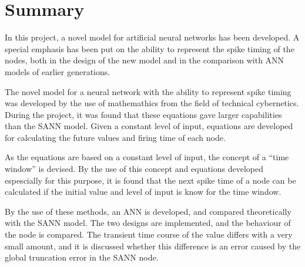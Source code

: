 
\section{Summary}
In this project, a novel model for artificial neural networks has been developed. 
A special emphasis has been put on the ability to represent the spike timing of the nodes, both in the design of the new model and in the comparison with ANN models of earlier generations.


%


The novel model for a neural network with the ability to represent spike timing was developed by the use of mathemathics from the field of technical cybernetics.
During the project, it was found that these equations gave larger capabilities than the SANN model. %
Given a constant level of input, equations are developed for calculating the future values and firing time of each node.

As the equations are based on a constant level of input, the concept of a ``time window'' is devised.
By the use of this concept and equations developed espescially for this purpose, it is found that the next spike time of a node can be calculated if the initial value and level of input is know for the time window. %

By the use of these methods, an ANN is developed, and compared theoretically with the SANN model. %
The two designs are implemented, and the behaviour of the node is compared.
%
The transient time course of the value differs with a very small amount, and it is discussed whether this difference is an error caused by the global truncation error in the SANN node.


